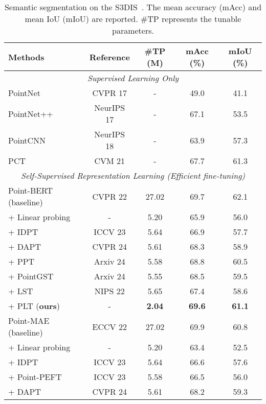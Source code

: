 \begin{table}
  \centering
  \scriptsize
  \setlength{\tabcolsep}{1.5mm}
  \caption{Semantic segmentation on the S3DIS~\cite{armeni20163d}. The
    mean accuracy (mAcc) and mean IoU (mIoU) are reported.
    \#TP represents the tunable parameters.}
    \begin{tabular}{lcccc}
    \toprule
    Methods & Reference & \#TP (M)& mAcc (\%) & mIoU (\%) \\
    \midrule
    \multicolumn{5}{c}{\textit{Supervised Learning Only}} \\
    \midrule
    PointNet~\cite{qi2017pointnet}  & CVPR 17  &- & 49.0 & 41.1 \\
    PointNet++~\cite{qi2017pointnet++}    & NeurIPS 17 &-  & 67.1 & 53.5 \\
    PointCNN~\cite{li2018pointcnn}  & NeurIPS 18 & - & 63.9 & 57.3 \\
    PCT~\cite{guo2021pct} & CVM 21& - & 67.7 & 61.3\\
    \midrule
    \multicolumn{5}{c}{\textit{ Self-Supervised Representation Learning (Efficient fine-tuning)}} \\
    \midrule
    Point-BERT~\cite{yu2022point} (baseline) &  CVPR 22 & 27.02 & 69.7 & 62.1 \\ 
    + Linear probing & - & 5.20  & 65.9  & 56.0  \\
    + IDPT~\cite{zha2023instance} & ICCV 23 & 5.64  & 66.9  & 57.7  \\
    + DAPT~\cite{zhou2024dynamic} & CVPR 24 & 5.61  & 68.3 & 58.9 \\
    + PPT~\cite{zhang2024positional} & Arxiv 24 & 5.58 & 68.8 & 60.5\\
    + PointGST~\cite{liang2024parameter} & Arxiv 24 & 5.55  & 68.5 & 59.5 \\
    + LST~\cite{sung2022lst} & NIPS 22 & 5.65 & 67.4 & 58.6 \\
    \rowcolor{linecolor!40}+ PLT (\textbf{ours})& - & \textbf{2.04}  & \textbf{69.6} & \textbf{61.1} \\
    \midrule
    Point-MAE~\cite{pang2022masked} (baseline) &  ECCV 22 & 27.02 & 69.9 & 60.8 \\ 
    + Linear probing & - & 5.20  & 63.4  & 52.5  \\
    + IDPT~\cite{zha2023instance} & ICCV 23 & 5.64  & 66.6  & 57.6  \\
    + Point-PEFT~\cite{tang2024point} & ICCV 23 & 5.58  & 66.5  & 56.0  \\
    + DAPT~\cite{zhou2024dynamic} & CVPR 24 & 5.61  & 68.2 & 59.3 \\

\end{tabular}
\end{table}
